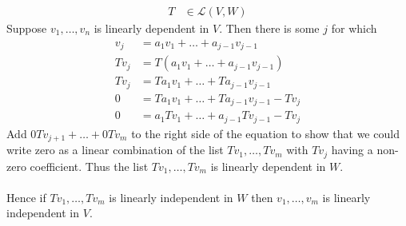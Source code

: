 \documentclass[a4paper]{article}
\begin{document}
%
\newcommand   \F { \mathbf{F}  }
\renewcommand \L { \mathcal{L} }
%
\large
\begin{align*}
    T &\in \L(V,W)
\end{align*}
Suppose $v_1,\dots,v_n$ is linearly dependent in $V$.
Then there is some $j$ for which
\begin{align*}
     v_j &= a_1v_1 + \dots + a_{j-1}v_{j-1}             \\
    Tv_j &= T( a_1v_1 + \dots + a_{j-1}v_{j-1} )         \\
    Tv_j &= T a_1v_1 + \dots + T a_{j-1}v_{j-1}          \\
       0 &= T a_1v_1 + \dots + T a_{j-1}v_{j-1} - Tv_j    \\
       0 &= a_1 Tv_1 + \dots + a_{j-1} T v_{j-1} - Tv_j
\end{align*}
Add $0Tv_{j+1}+\dots+0Tv_m$ to the right side of the equation to show that we could write zero as a linear combination of the list $Tv_1,\dots,Tv_m$ with $Tv_j$ having a non-zero coefficient.
Thus the list $Tv_1,\dots,Tv_m$ is linearly dependent in $W$.
\\
\\
Hence if $Tv_1,\dots,Tv_m$ is linearly independent in $W$ then $v_1,\dots,v_m$ is linearly independent in $V$.
\end{document}
